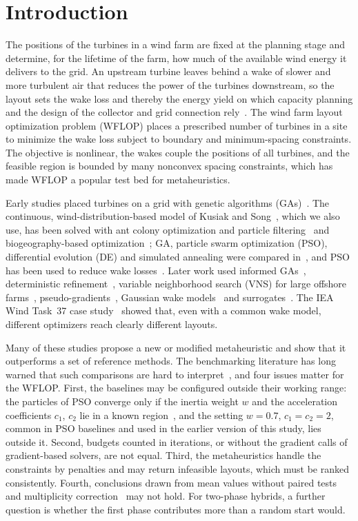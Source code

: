 \section{Introduction}

The positions of the turbines in a wind farm are fixed at the planning stage and determine, for the lifetime of the farm, how much of the available wind energy it delivers to the grid. An upstream turbine leaves behind a wake of slower and more turbulent air that reduces the power of the turbines downstream, so the layout sets the wake loss and thereby the energy yield on which capacity planning and the design of the collector and grid connection rely~\cite{Srikakulapu2018,Hou2019}. The wind farm layout optimization problem (WFLOP) places a prescribed number of turbines in a site to minimize the wake loss subject to boundary and minimum-spacing constraints. The objective is nonlinear, the wakes couple the positions of all turbines, and the feasible region is bounded by many nonconvex spacing constraints, which has made WFLOP a popular test bed for metaheuristics.

Early studies placed turbines on a grid with genetic algorithms (GAs)~\cite{Mosetti1994,Grady2005}. The continuous, wind-distribution-based model of Kusiak and Song~\cite{Kusiak2010}, which we also use, has been solved with ant colony optimization and particle filtering~\cite{Eroglu2012,Eroglu2013} and biogeography-based optimization~\cite{Bansal2017}; GA, particle swarm optimization (PSO), differential evolution (DE) and simulated annealing were compared in~\cite{Elkinton2008}, and PSO has been used to reduce wake losses~\cite{Asaah2021}. Later work used informed GAs~\cite{Ju2019,Bai2022}, deterministic refinement~\cite{Nagpal2021}, variable neighborhood search (VNS) for large offshore farms~\cite{Cazzaro2022}, pseudo-gradients~\cite{Quaeghebeur2021}, Gaussian wake models~\cite{Tao2020} and surrogates~\cite{Yang2023,Wang2024,Li2025}. The IEA Wind Task~37 case study~\cite{Baker2019} showed that, even with a common wake model, different optimizers reach clearly different layouts.

Many of these studies propose a new or modified metaheuristic and show that it outperforms a set of reference methods. The benchmarking literature has long warned that such comparisons are hard to interpret~\cite{Sorensen2015,BartzBeielstein2020}, and four issues matter for the WFLOP. First, the baselines may be configured outside their working range: the particles of PSO converge only if the inertia weight $w$ and the acceleration coefficients $c_1$, $c_2$ lie in a known region~\cite{Clerc2002,Poli2009}, and the setting $w=0.7$, $c_1=c_2=2$, common in PSO baselines and used in the earlier version of this study, lies outside it. Second, budgets counted in iterations, or without the gradient calls of gradient-based solvers, are not equal. Third, the metaheuristics handle the constraints by penalties and may return infeasible layouts, which must be ranked consistently. Fourth, conclusions drawn from mean values without paired tests and multiplicity correction~\cite{Demsar2006,Benavoli2016} may not hold. For two-phase hybrids, a further question is whether the first phase contributes more than a random start would.

